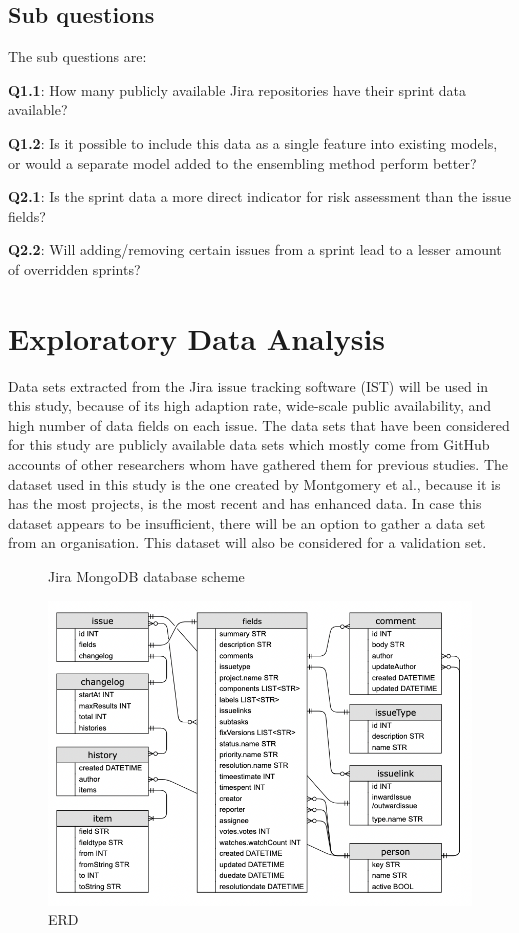 \documentclass[sigconf]{acmart}
\begin{document}
\subsection{Sub questions}
The sub questions are:

\textbf{Q1.1}: How many publicly available Jira repositories have their sprint data available?

\textbf{Q1.2}: Is it possible to include this data as a single feature into existing models, or would a separate model added to the ensembling method perform better?

\textbf{Q2.1}: Is the sprint data a more direct indicator for risk assessment than the issue fields?  

\textbf{Q2.2}: Will adding/removing certain issues from a sprint lead to a lesser amount of overridden sprints?


\section{Exploratory Data Analysis}
Data sets extracted from the Jira issue tracking software (IST) will be used in this study, because of its high adaption rate, wide-scale public availability, and high number of data fields on each issue.
The data sets that have been considered for this study are publicly available data sets which mostly come from GitHub accounts of other researchers whom have gathered them for previous studies.
The dataset used in this study is the one created by Montgomery et al.\cite{montgomery2022jira}, because it is has the most projects, is the most recent and has enhanced data.
In case this dataset appears to be insufficient, there will be an option to gather a data set from an organisation. This dataset will also be considered for a validation set.

\begin{figure}[h]
  \caption{Jira MongoDB database scheme}
  \centering
  \includegraphics[width=\linewidth]{overleaf/images/ERD-jira.png}
  \caption{ERD}
\end{figure}
\end{document}
